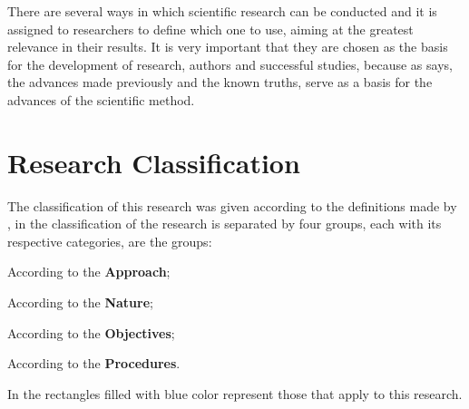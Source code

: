 
There are several ways in which scientific research can be conducted and it is assigned to researchers to define which one to use, aiming at the greatest relevance in their results. 
It is very important that they are chosen as the basis for the development of research, authors and successful studies, because as  says, the advances made previously and the known truths, serve as a basis for the advances of the scientific method.


\section{Research Classification}\label{sec:met-classification}


The classification of this research was given according to the definitions made by , in  the classification of the research is separated by four groups, each with its respective categories, are the groups: 
\begin{inparaenum}[(i)]
  \item According to the \textbf{Approach};
  \item According to the \textbf{Nature};
  \item According to the \textbf{Objectives};
  \item According to the \textbf{Procedures}.
\end{inparaenum}
In  the rectangles filled with blue color represent those that apply to this research. 

